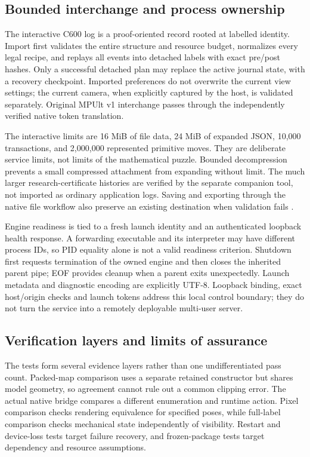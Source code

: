 \documentclass[a4paper,11pt]{article}
\begin{document}
\subsection{Bounded interchange and process ownership}

The interactive C600 log is a proof-oriented record rooted at labelled identity. Import first validates the entire structure and resource budget, normalizes every legal recipe, and replays all events into detached labels with exact pre/post hashes. Only a successful detached plan may replace the active journal state, with a recovery checkpoint. Imported preferences do not overwrite the current view settings; the current camera, when explicitly captured by the host, is validated separately. Original MPUlt v1 interchange passes through the independently verified native token translation.

The interactive limits are 16 MiB of file data, 24 MiB of expanded JSON, 10,000 transactions, and 2,000,000 represented primitive moves. They are deliberate service limits, not limits of the mathematical puzzle. Bounded decompression prevents a small compressed attachment from expanding without limit. The much larger research-certificate histories are verified by the separate companion tool, not imported as ordinary application logs. Saving and exporting through the native file workflow also preserve an existing destination when validation fails \cite{sourcecode,validation}.

Engine readiness is tied to a fresh launch identity and an authenticated loopback health response. A forwarding executable and its interpreter may have different process IDs, so PID equality alone is not a valid readiness criterion. Shutdown first requests termination of the owned engine and then closes the inherited parent pipe; EOF provides cleanup when a parent exits unexpectedly. Launch metadata and diagnostic encoding are explicitly UTF-8. Loopback binding, exact host/origin checks and launch tokens address this local control boundary; they do not turn the service into a remotely deployable multi-user server.

\subsection{Verification layers and limits of assurance}

The tests form several evidence layers rather than one undifferentiated pass count. Packed-map comparison uses a separate retained constructor but shares model geometry, so agreement cannot rule out a common clipping error. The actual native bridge compares a different enumeration and runtime action. Pixel comparison checks rendering equivalence for specified poses, while full-label comparison checks mechanical state independently of visibility. Restart and device-loss tests target failure recovery, and frozen-package tests target dependency and resource assumptions.
\end{document}

